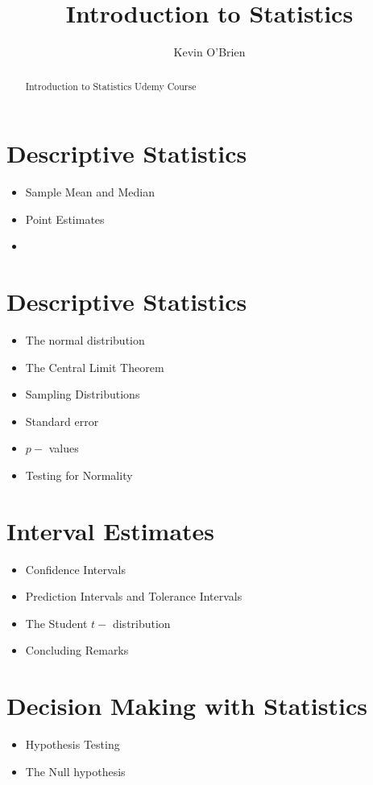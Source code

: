 \documentclass[12pt]{article}
\title{Introduction to Statistics}
\author{Kevin O'Brien}
\begin{document}
\maketitle

\begin{abstract}
Introduction to Statistics Udemy Course
\end{abstract}
\section{Descriptive Statistics}
\begin{itemize}
\item Sample Mean and Median
\item Point Estimates
\item 
\end{itemize}
\section{Descriptive Statistics}
\begin{itemize}
\item The normal distribution
\item The Central Limit Theorem
\item Sampling Distributions
\item Standard error
\item $p-$ values
\item Testing for Normality
\end{itemize}
\section{Interval Estimates}
\begin{itemize}
\item Confidence Intervals
\item Prediction Intervals and Tolerance Intervals
\item The Student $t-$ distribution
\item Concluding Remarks
\end{itemize}
\section{Decision Making with Statistics}
\begin{itemize}
\item Hypothesis Testing
\item The Null hypothesis
\end{itemize}
\end{document}
